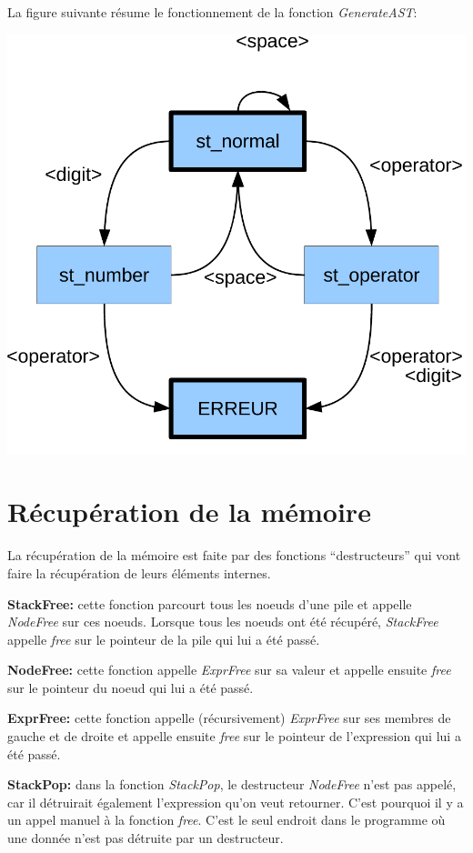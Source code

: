 \documentclass[10pt]{report}
\begin{document}
La figure suivante résume le fonctionnement de la fonction \emph{GenerateAST}:

\begin{center}
  \includegraphics[scale=0.33]{statemachine}
\end{center}



\newpage

\section{Récupération de la mémoire}

La récupération de la mémoire est faite par des fonctions
``destructeurs'' qui vont faire la récupération de leurs éléments
internes.

\textbf{StackFree:} cette fonction parcourt tous les noeuds d'une pile
et appelle \emph{NodeFree} sur ces noeuds.  Lorsque tous les noeuds
ont été récupéré, \emph{StackFree} appelle \emph{free} sur le pointeur
de la pile qui lui a été passé.

\textbf{NodeFree:} cette fonction appelle \emph{ExprFree} sur sa
valeur et appelle ensuite \emph{free} sur le pointeur du noeud qui lui
a été passé.

\textbf{ExprFree:} cette fonction appelle (récursivement)
\emph{ExprFree} sur ses membres de gauche et de droite et appelle
ensuite \emph{free} sur le pointeur de l'expression qui lui a été
passé.

\textbf{StackPop:} dans la fonction \emph{StackPop}, le destructeur
\emph{NodeFree} n'est pas appelé, car il détruirait également
l'expression qu'on veut retourner.  C'est pourquoi il y a un appel
manuel à la fonction \emph{free}.  C'est le seul endroit dans le
programme où une donnée n'est pas détruite par un destructeur.
\end{document}
